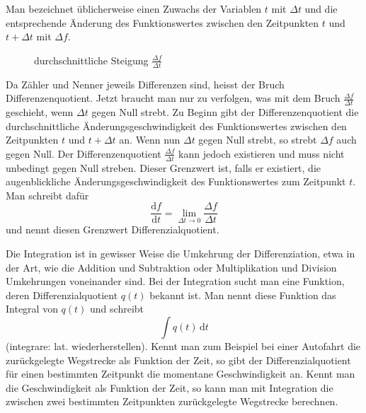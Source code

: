 \documentclass[%
11pt,%
twoside,%
titlepage,%
german,%
headsepline%
]{scrartcl}
\newcommand{\definition}[1]{\colorbox{emerald}{#1}}
\theoremstyle{definition}
\theoremstyle{plain}
\begin{document}
Man bezeichnet üblicherweise einen Zuwachs der Variablen $t$ mit $\Delta t$ und die entsprechende Änderung des Funktionswertes zwischen den Zeitpunkten $t$ und $t+\Delta t$ mit $\Delta f$.
\begin{figure}
\centering
{}
\caption{durchschnittliche Steigung $\frac{\Delta f}{\Delta t}$}
\end{figure}
Da Zähler und Nenner jeweils Differenzen sind, heisst der Bruch \definition{Differenzenquotient}. Jetzt braucht man nur zu verfolgen, was mit dem Bruch $\frac{\Delta f}{\Delta t}$ geschieht, wenn $\Delta t$ gegen Null strebt. Zu Beginn gibt der Differenzenquotient die durchschnittliche Ände\-rungs\-ge\-schwindig\-keit des Funktionswertes zwischen den Zeitpunkten $t$ und $t+\Delta t$ an. Wenn nun $\Delta t$ gegen Null strebt, so strebt $\Delta f$ auch gegen Null. Der  Differenzenquotient $\frac{\Delta f}{\Delta t}$ kann jedoch existieren und muss nicht unbedingt gegen Null streben. Dieser Grenzwert ist, falls er existiert, die augenblickliche Änderungsgeschwindigkeit des Funktionswertes zum Zeitpunkt $t$.
Man schreibt dafür
$$\frac{\mathrm{d}f}{\mathrm{d}t}=\lim_{\Delta t\to0}\frac{\Delta f}{\Delta t}$$
und nennt diesen Grenzwert \definition{Differenzialquotient}.

Die \definition{Integration} ist in gewisser Weise die Umkehrung der Differenziation, etwa in der Art, wie die Addition und Subtraktion oder Multiplikation und Division Umkehrungen voneinander sind. Bei der Integration sucht man eine Funktion, deren Differenzialquotient $q(t)$ bekannt ist. Man nennt diese Funktion das Integral von $q(t)$ und
schreibt
$$\int q(t)\,\mathrm{d}t$$
(integrare: lat. wiederherstellen).
Kennt man zum Beispiel bei einer Autofahrt die zu\-rück\-ge\-legte Wegstrecke als Funktion der Zeit, so gibt der Differenzialquotient für einen bestimmten Zeitpunkt die momentane Geschwindigkeit an. Kennt man die Geschwindigkeit als Funktion der Zeit, so kann man mit Integration die zwischen zwei bestimmten Zeitpunkten zurückgelegte Wegstrecke berechnen.
\end{document}
